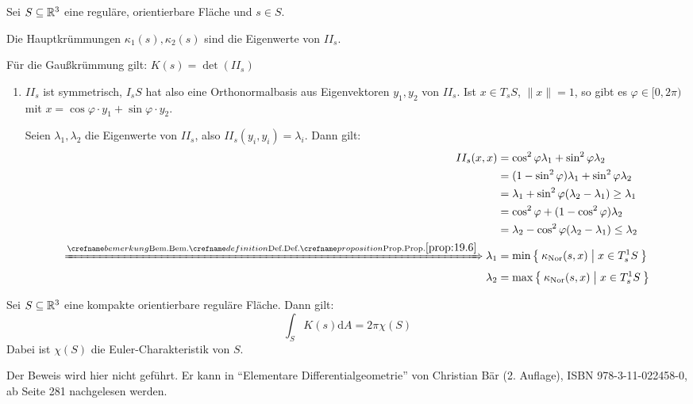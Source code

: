 \begin{satz}%
    Sei $S \subseteq \mathbb{R}^3$ eine reguläre, orientierbare Fläche und $s \in S$.
    \begin{satzenum}
        \item Die Hauptkrümmungen $\kappa_1(s), \kappa_2(s)$ sind die Eigenwerte
              von $II_s$.
        \item Für die Gaußkrümmung gilt: $K(s) = \det(II_s)$
    \end{satzenum}
\end{satz}

\begin{beweis}\leavevmode
    \begin{enumerate}[label=\alph*)]
        \item $II_s$ ist symmetrisch, $I_s S$ hat also eine Orthonormalbasis aus
              Eigenvektoren $y_1, y_2$ von $II_s$. Ist $x \in T_s S$, $\|x\| = 1$,
              so gibt es $\varphi \in [0,2\pi)$ mit $x = \cos \varphi \cdot y_1 + \sin \varphi \cdot y_2$.

              Seien $\lambda_1, \lambda_2$ die Eigenwerte von $II_s$, also 
              $II_s(y_i, y_i) = \lambda_i$. Dann gilt:
              \begin{align*}
                  II_s (x,x) &= \cos^2 \varphi \lambda_1 + \sin^2 \varphi \lambda_2\\
                  &= (1- \sin^2 \varphi) \lambda_1 + \sin^2 \varphi \lambda_2\\
                  &= \lambda_1 + \sin^2 \varphi (\lambda_2 - \lambda_1) \geq \lambda_1\\
                  &= \cos^2 \varphi + (1 - \cos^2 \varphi) \lambda_2\\
                  &= \lambda_2 - \cos^2 \varphi (\lambda_2 - \lambda_1) \leq \lambda_2\\
                  \xRightarrow{\crefabbr{prop:19.6}} \lambda_1 &= \min \Set{\kappanor (s,x) | x \in T^1_s S}\\
                  \lambda_2 &= \max \Set{\kappanor (s,x) | x \in T^1_s S}
              \end{align*}
    \end{enumerate}
\end{beweis}

\begin{satz}
    Sei $S \subseteq \mathbb{R}^3$ eine kompakte orientierbare reguläre Fläche. Dann gilt:
    \[\int_S K(s) \mathrm{d}A = 2 \pi \chi(S)\]
    Dabei ist $\chi(S)$ die Euler-Charakteristik von $S$.
\end{satz}

\begin{beweis}
    Der Beweis wird hier nicht geführt. Er kann in \enquote{Elementare Differentialgeometrie}
    von Christian Bär (2. Auflage), ISBN 978-3-11-022458-0, ab Seite 281 nachgelesen werden.
\end{beweis}